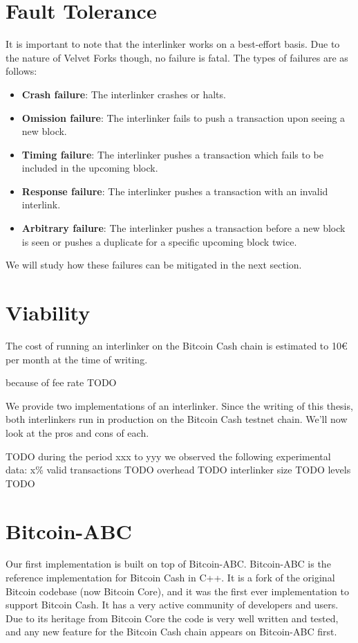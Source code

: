 \section{Fault Tolerance}
It is important to note that the interlinker works on a best-effort basis. Due to the nature of Velvet Forks though, no failure is fatal. The types of failures are as follows:

\begin{itemize}
  \item \textbf{Crash failure}: The interlinker crashes or halts.
  \item \textbf{Omission failure}: The interlinker fails to push a transaction upon seeing a new block.
  \item \textbf{Timing failure}: The interlinker pushes a transaction which fails to be included in the upcoming block.
  \item \textbf{Response failure}: The interlinker pushes a transaction with an invalid interlink.
  \item \textbf{Arbitrary failure}: The interlinker pushes a transaction before a new block is seen or pushes a duplicate for a specific upcoming block twice.
\end{itemize}

We will study how these failures can be mitigated in the next section.

\section{Viability}
The cost of running an interlinker on the Bitcoin Cash chain is estimated to 10€ per month at the time of writing.

because of fee rate TODO

We provide two implementations of an interlinker. Since the writing of this thesis, both interlinkers run in production on the Bitcoin Cash testnet chain. We'll now look at the pros and cons of each.

TODO during the period xxx to yyy we observed the following experimental data:
x\% valid transactions TODO
overhead TODO
interlinker size TODO
levels TODO

\section{Bitcoin-ABC}
Our first implementation is built on top of Bitcoin-ABC. Bitcoin-ABC is the reference implementation for Bitcoin Cash in C++. It is a fork of the original Bitcoin codebase (now Bitcoin Core), and it was the first ever implementation to support Bitcoin Cash. It has a very active community of developers and users. Due to its heritage from Bitcoin Core the code is very well written and tested, and any new feature for the Bitcoin Cash chain appears on Bitcoin-ABC first.

